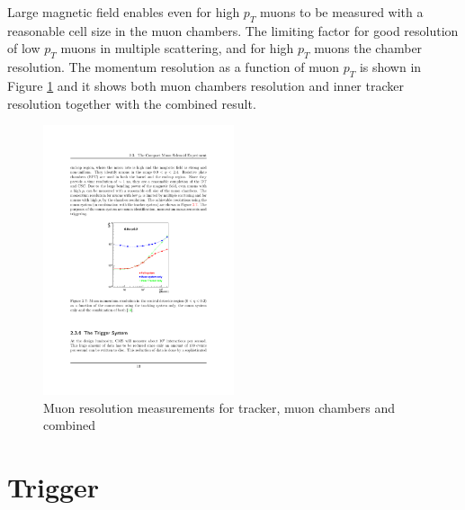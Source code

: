 \par Large magnetic field enables even for high $p_T$ muons to be measured with a reasonable cell size in the muon chambers. The limiting factor for good resolution of low $p_T$ muons in multiple scattering, and for high $p_T$ muons the chamber resolution. The momentum resolution as a function of muon $p_T$ is shown in Figure \ref{fig:MU_pt} and it shows both muon chambers resolution and inner tracker resolution together with the combined result. 
\begin{figure}[htbp]
	\centering
		\includegraphics[width=0.5\textwidth]{Figures/MU_pt_res.pdf}
	\caption[Muon resolution measurements for tracker, muon chambers and combined]{Muon resolution measurements for tracker, muon chambers and combined \cite{Chatrchyan:2008aa}}
	\label{fig:MU_pt}
\end{figure} 



\section{Trigger}

